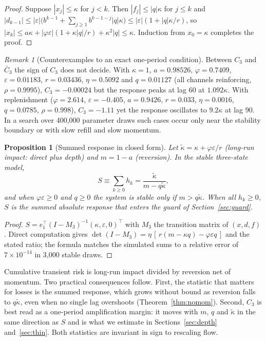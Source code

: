 \documentclass[12pt]{article}
\newtheorem{proposition}[theorem]{Proposition}
\theoremstyle{definition}
\theoremstyle{remark}
\newtheorem{remark}[theorem]{Remark}
\begin{document}
\begin{proof}
Suppose $|x_j|\le\kappa$ for $j<k$. Then $|f_j|\le|q|\kappa$ for $j\le k$ and $|d_{k-1}|\le|\varepsilon|\bigl(b^{k-1}+\sum_{j\ge1}b^{k-1-j}|q|\kappa\bigr)\le|\varepsilon|(1+|q|\kappa/r)$, so $|x_k|\le a\kappa+|\varphi\varepsilon|(1+\kappa|q|/r)+\kappa^2|q|\le\kappa$. Induction from $x_0=\kappa$ completes the proof.
\end{proof}

\begin{remark}[Counterexamples to an exact one-period condition]\label{rem:counter}
Between $C_3$ and $\bar C_3$ the sign of $C_3$ does not decide. With $\kappa=1$, $a=0.98526$, $\varphi=0.7409$, $\varepsilon=0.01183$, $r=0.03436$, $\eta=0.5092$ and $q=0.01127$ (all channels reinforcing, $\rho=0.9995$), $C_3=-0.00024$ but the response peaks at lag 60 at $1.092\kappa$. With replenishment ($\varphi=2.614$, $\varepsilon=-0.405$, $a=0.9426$, $r=0.033$, $\eta=0.0016$, $q=0.0785$, $\rho=0.998$), $C_3=-1.11$ yet the response oscillates to $9.2\kappa$ at lag 90. In a search over 400{,}000 parameter draws such cases occur only near the stability boundary or with slow refill and slow momentum.
\end{remark}

\begin{proposition}[Summed response in closed form]\label{prop:sum}
Let $\tilde\kappa=\kappa+\varphi\varepsilon/r$ (long-run impact: direct plus depth) and $m=1-a$ (reversion). In the stable three-state model,
\[
S\equiv\sum_{k\ge0}h_k=\frac{\tilde\kappa}{m-q\tilde\kappa},
\]
and when $\varphi\varepsilon\ge0$ and $q\ge0$ the system is stable only if $m>q\tilde\kappa$. When all $h_k\ge0$, $S$ is the summed absolute response that enters the guard of Section~\ref{sec:guard}.
\end{proposition}

\begin{proof}
$S=e_1^\top(I-M_3)^{-1}(\kappa,\varepsilon,0)^\top$ with $M_3$ the transition matrix of $(x,d,f)$. Direct computation gives $\det(I-M_3)=\eta\,[\,r(m-\kappa q)-\varphi\varepsilon q\,]$ and the stated ratio; the formula matches the simulated sums to a relative error of $7\times10^{-14}$ in 3{,}000 stable draws.
\end{proof}

Cumulative transient risk is long-run impact divided by reversion net of momentum. Two practical consequences follow. First, the statistic that matters for losses is the summed response, which grows without bound as reversion falls to $q\tilde\kappa$, even when no single lag overshoots (Theorem~\ref{thm:nomom}). Second, $C_3$ is best read as a one-period amplification margin: it moves with $m$, $q$ and $\tilde\kappa$ in the same direction as $S$ and is what we estimate in Sections~\ref{sec:depth} and~\ref{sec:thin}. Both statistics are invariant in sign to rescaling flow.
\end{document}

